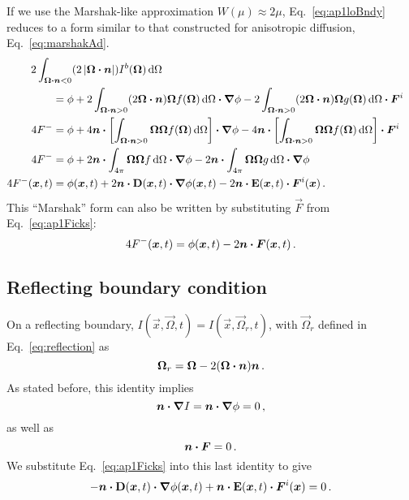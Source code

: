 If we use the Marshak-like approximation $W(\mu)\approx 2\mu$,
Eq.~\eqref{eq:ap1loBndy} reduces to a form similar to that constructed for
anisotropic diffusion, Eq.~\eqref{eq:marshakAd}.
\begin{align}\nonumber
  \lefteqn{2\int_{\vec{\Omega}\vd \vec{n} < 0}
  ( 2\abs{\vec{\Omega} \vd \vec{n}} ) I^b(\vec{\Omega}) \ud\Omega}\qquad
\\ \nonumber
  &= \phi
  + 2\int_{\vec{\Omega}\vd \vec{n} > 0} ( 2\vec{\Omega} \vd \vec{n} )
  \vec{\Omega} f(\vec{\Omega}) \ud\Omega \vd \grad \phi
  - 2\int_{\vec{\Omega}\vd \vec{n} > 0} ( 2\vec{\Omega} \vd \vec{n} )
  \vec{\Omega} g(\vec{\Omega}) \ud\Omega \vd \vec{F}^i
\\ \nonumber
  4 F^-
  &= \phi
  + 4 \vec{n} \vd \left[ \int_{\vec{\Omega}\vd \vec{n} > 0} \vec{\Omega}
  \vec{\Omega} f(\vec{\Omega}) \ud\Omega \right] \vd \grad \phi
  - 4 \vec{n} \vd \left[ \int_{\vec{\Omega}\vd \vec{n} > 0} \vec{\Omega}
  \vec{\Omega} f(\vec{\Omega}) \ud\Omega \right] \vd \vec{F}^i
\\ \nonumber
  4 F^-
  &= \phi
  + 2 \vec{n} \vd \int_{4\pi} \vec{\Omega} \vec{\Omega} f \ud\Omega \vd \grad
  \phi
  - 2 \vec{n} \vd \int_{4\pi} \vec{\Omega} \vec{\Omega} g \ud\Omega \vd \grad
  \phi
\\ \label{eq:ap1marshak}
  4 F^-(\vec{x}, t)
  &= \phi(\vec{x}, t)
  + 2 \vec{n} \vd \Dtens(\vec{x},t) \vd \grad \phi(\vec{x}, t)
  - 2 \vec{n} \vd \Etens(\vec{x},t) \vd \vec{F}^i(\vec{x}) \,.
\end{align}
This ``Marshak'' form can also be written by substituting $\vec{F}$ from
Eq.~\eqref{eq:ap1Ficks}:
\begin{equation} \label{eq:ap1marshak2}
  4 F^-(\bm{x}, t)
  = \phi(\bm{x}, t)
  - 2 \bm{n} \bm{\cdot} \bm{F}(\bm{x}, t) \,.
\end{equation}

\subsection{Reflecting boundary condition}
On a reflecting boundary, $I(\vec{x},\vec{\Omega},t) =
I(\vec{x},\vec{\Omega}_r,t)$, with $\vec{\Omega}_r$ defined in
Eq.~\eqref{eq:reflection} as
\begin{equation*}
  \bm{\Omega}_r = \bm{\Omega} - 2(\bm{\Omega} \bm{\cdot} \bm{n}) \bm{n}\,.
\end{equation*}
As stated before, this identity implies
\begin{equation*}
  \bm{n}\bm{\cdot} \bm{\nabla} I = \bm{n} \bm{\cdot} \bm{\nabla} \phi = 0\,,
\end{equation*}
as well as
\begin{equation*}
  \bm{n}\bm{\cdot}\bm{F}=0\,.
\end{equation*}
We substitute Eq.~\eqref{eq:ap1Ficks} into this last identity to give
\begin{equation}\label{eq:ap1LoRefl1}
  - \bm{n}\bm{\cdot} \mathbf{D}(\bm{x},t) \bm{\cdot} \bm{\nabla} \phi(\bm{x},t)
  + \bm{n}\bm{\cdot} \mathbf{E}(\bm{x},t) \bm{\cdot} \bm{F}^i(\bm{x}) = 0\,.
\end{equation}

